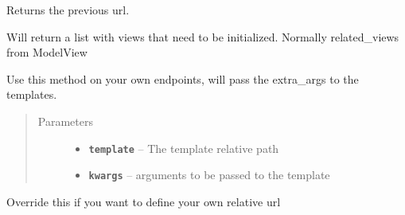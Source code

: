 \documentclass[letterpaper,10pt,english]{sphinxmanual}
\begin{document}
\begin{fulllineitems}

\begin{fulllineitems}
\label{api:flask.ext.appbuilder.baseviews.BaseView.get_redirect}
Returns the previous url.

\end{fulllineitems}


\begin{fulllineitems}
\label{api:flask.ext.appbuilder.baseviews.BaseView.get_uninit_inner_views}
Will return a list with views that need to be initialized.
Normally related\_views from ModelView

\end{fulllineitems}


\begin{fulllineitems}
\label{api:flask.ext.appbuilder.baseviews.BaseView.render_template}
Use this method on your own endpoints, will pass the extra\_args
to the templates.
\begin{quote}\begin{description}
\item[{Parameters}] \leavevmode\begin{itemize}
\item {} 
\textbf{\texttt{template}} -- The template relative path

\item {} 
\textbf{\texttt{kwargs}} -- arguments to be passed to the template

\end{itemize}

\end{description}\end{quote}

\end{fulllineitems}


\begin{fulllineitems}
\label{api:flask.ext.appbuilder.baseviews.BaseView.route_base}
Override this if you want to define your own relative url


\end{fulllineitems}
\end{fulllineitems}
\end{document}
